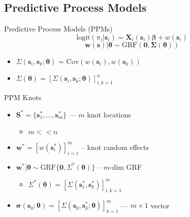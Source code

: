 \documentclass{beamer}
\begin{document}
\subsection{Predictive Process Models}

\begin{frame}{Predictive Process Models (PPMs)}{\citep{Banerjee2008}} %
$$ \text{logit}(\pi_{i}|\pmb{s}_{i}) = \pmb{X}_{i}(\pmb{s}_{i}) \pmb{\beta} + w(\pmb{s}_{i}) $$
$$ \pmb{w}(\pmb{s}) | \pmb{\theta} \sim \text{GRF}(\pmb{0}, \pmb{\Sigma}(\pmb{\theta})) $$
\begin{itemize}
\addtolength{\itemsep}{0.5\baselineskip}
\item $\Sigma(\pmb{s}_{i}, \pmb{s}_{k}; \pmb{\theta})$ = $\text{Cov}\left(w(\pmb{s}_{i}), w(\pmb{s}_{k}) \right)$
\item $\Sigma(\pmb{\theta}) = [\Sigma(\pmb{s}_{i}, \pmb{s}_{k}; \pmb{\theta})]_{i,k=1}^{n}$
\end{itemize}
\end{frame}

\begin{frame}{PPM Knots} %
\begin{itemize}
\addtolength{\itemsep}{0.5\baselineskip}
\item $\pmb{S}^{*} = \{\pmb{s}_{1}^{*}, \dots, \pmb{s}_{m}^{*}\}$ --- $m$ knot locations
  \begin{itemize}
  \item $m < < n$
  \end{itemize}
\item $\pmb{w}^{*} = \left[w(\pmb{s}_{i}^{*})\right]_{i=1}^{m}$ -- knot random effects
\item $\pmb{w}^{*}|\pmb{\theta} \sim \text{GRF}\{\pmb{0}, \Sigma^{*}(\pmb{\theta})\}$ -- $m$-dim GRF \\
  \begin{itemize}
  \item $\Sigma^{*}(\pmb{\theta}) = \left[\Sigma(\pmb{s}_{i}^{*}, \pmb{s}_{k}^{*})\right]_{i,k = 1}^{m}$
  \end{itemize}
\item $\pmb{\sigma}(\pmb{s}_{0};\pmb{\theta}) = \left[\Sigma(\pmb{s}_{0}, \pmb{s}_{k}^{*}; \pmb{\theta})\right]_{k = 1}^{m}$ --- $m \times 1$ vector
\end{itemize}
\end{frame}
\end{document}
